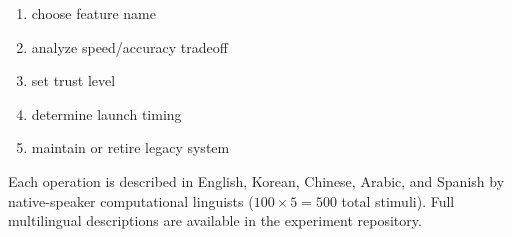 \documentclass[11pt]{article}
\theoremstyle{definition}
\begin{document}
\begin{enumerate}[nosep]
rewrite rejection politely \item choose feature name \item analyze speed/accuracy tradeoff \item set trust level \item determine launch timing \item maintain or retire legacy system
\end{enumerate}
\normalsize

Each operation is described in English, Korean, Chinese, Arabic, and Spanish by native-speaker computational linguists ($100 \times 5 = 500$ total stimuli). Full multilingual descriptions are available in the experiment repository.
\end{document}
